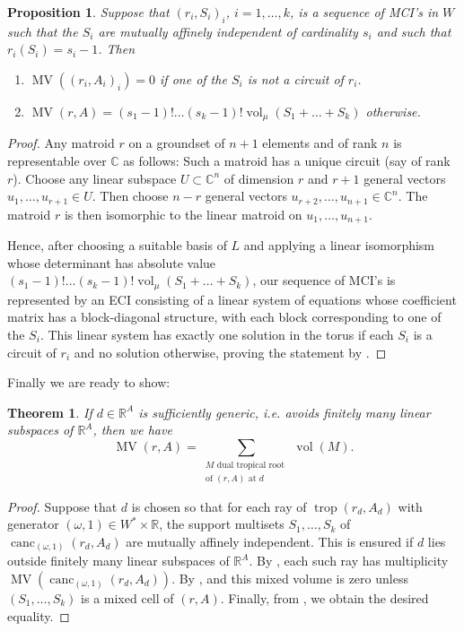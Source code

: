 \documentclass[a4paper]{article}
\newtheorem{theorem}{Theorem}
\newtheorem{proposition}{Proposition}
\theoremstyle{remark}
\def\RR{\mathbb{R}}
\def\CC{\mathbb{C}}
\DeclareMathOperator{\trop}{trop}
\DeclareMathOperator{\mv}{MV}
\DeclareMathOperator{\vol}{vol}
\DeclareMathOperator{\canc}{canc}
\begin{document}
\begin{proposition}
  \label{prop:mvsimplex}
  Suppose that $(r_i,S_i)_i$, $i=1,\dots,k$, is a sequence of MCI's in $W$ such that
  the $S_i$ are mutually affinely independent of cardinality $s_i$ and such that
  $r_i(S_i) = s_i - 1$. Then
  \begin{enumerate}
  \item $\mv((r_i,A_i)_i) = 0$ if one of the $S_i$ is not a circuit of $r_i$.
  \item
    $\mv(r,A) = (s_1-1)!\hdots (s_k-1)!\vol_{\mu}(S_1+\hdots + S_k)$
    otherwise.
  \end{enumerate}
\end{proposition}
\begin{proof}
  Any matroid $r$ on a groundset of $n+1$ elements and of rank $n$ is
  representable over $\CC$ as follows: Such a matroid has a unique
  circuit (say of rank $r$). Choose any linear subspace
  $U\subset \CC^{n}$ of dimension $r$ and $r + 1$ general vectors
  $u_1,\dots,u_{r+1}\in U$. Then choose $n-r$ general vectors
  $u_{r+2},\dots,u_{n+1}\in \CC^n$. The matroid $r$ is then isomorphic
  to the linear matroid on $u_1,\dots,u_{n+1}$.

  Hence, after choosing a suitable basis of $L$ and applying a linear
  isomorphism whose determinant has absolute value
  $(s_1-1)!\hdots (s_k-1)!\vol_{\mu}(S_1+\hdots + S_k)$, our sequence of
  MCI's is represented by an ECI consisting of a linear system of
  equations whose coefficient matrix has a block-diagonal structure,
  with each block corresponding to one of the $S_i$. This linear
  system has exactly one solution in the torus if each $S_i$ is a
  circuit of $r_i$ and no solution otherwise, proving the statement by
  .
\end{proof}

Finally we are ready to show:

\begin{theorem}
  \label{thm:mv}
  If $d\in \RR^A$ is sufficiently generic, i.e. avoids finitely many
  linear subspaces of $\RR^A$, then we have
  \[\mv(r,A) = \sum_{\substack{M\text{ dual tropical root }\\\text{of }(r,A)\text{ at }d}}\vol(M).\]
\end{theorem}
\begin{proof}
  Suppose that $d$ is chosen so that for each
  ray of $\trop(r_d,A_d)$ with generator
  $(\omega,1)\in W^{*}\times \RR$, the support multisets
  $S_1,\dots,S_k$ of $\canc_{(\omega,1)}(r_d,A_d)$ are mutually affinely
  independent. This is ensured if $d$ lies outside finitely many linear
  subspaces of $\RR^A$. By , each such ray has multiplicity
  $\mv(\canc_{(\omega,1)}(r_d,A_d))$. By ,
   and  this mixed volume is
  zero unless $(S_1,\dots,S_k)$ is a mixed cell of $(r,A)$. Finally,
  from , we obtain the desired equality.
\end{proof}
\end{document}
